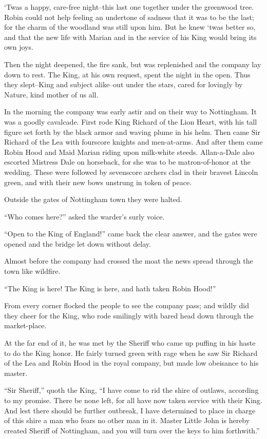 `Twas a happy, care-free night--this last one together under the
greenwood tree. Robin could not help feeling an undertone of sadness
that it was to be the last; for the charm of the woodland was still upon
him. But he knew `twas better so, and that the new life with Marian and
in the service of his King would bring its own joys.

Then the night deepened, the fire sank, but was replenished and the
company lay down to rest. The King, at his own request, spent the night
in the open. Thus they slept--King and subject alike--out under the
stars, cared for lovingly by Nature, kind mother of us all.

In the morning the company was early astir and on their way to
Nottingham. It was a goodly cavalcade. First rode King Richard of the
Lion Heart, with his tall figure set forth by the black armor and waving
plume in his helm. Then came Sir Richard of the Lea with fourscore
knights and men-at-arms. And after them came Robin Hood and Maid Marian
riding upon milk-white steeds. Allan-a-Dale also escorted Mistress Dale
on horseback, for she was to be matron-of-honor at the wedding. These
were followed by sevenscore archers clad in their bravest Lincoln green,
and with their new bows unstrung in token of peace.

Outside the gates of Nottingham town they were halted.

``Who comes here?'' asked the warder's surly voice.

``Open to the King of England!'' came back the clear answer, and the
gates were opened and the bridge let down without delay.

Almost before the company had crossed the moat the news spread through
the town like wildfire.

``The King is here! The King is here, and hath taken Robin Hood!''

From every corner flocked the people to see the company pass; and wildly
did they cheer for the King, who rode smilingly with bared head down
through the market-place.

At the far end of it, he was met by the Sheriff who came up puffing in
his haste to do the King honor. He fairly turned green with rage when he
saw Sir Richard of the Lea and Robin Hood in the royal company, but made
low obeisance to his master.

``Sir Sheriff,'' quoth the King, ``I have come to rid the shire of
outlaws, according to my promise. There be none left, for all have now
taken service with their King. And lest there should be further
outbreak, I have determined to place in charge of this shire a man who
fears no other man in it. Master Little John is hereby created Sheriff
of Nottingham, and you will turn over the keys to him forthwith.''

